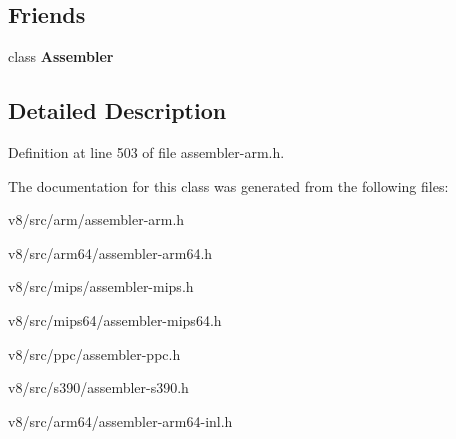 \subsection*{Friends}
\begin{DoxyCompactItemize}
\item 
\mbox{\label{classv8_1_1internal_1_1MemOperand_ab679df99d1569d09fdf3358620a4ad34}} 
class {\bfseries Assembler}
\end{DoxyCompactItemize}


\subsection{Detailed Description}


Definition at line 503 of file assembler-\/arm.\+h.



The documentation for this class was generated from the following files\+:\begin{DoxyCompactItemize}
\item 
v8/src/arm/assembler-\/arm.\+h\item 
v8/src/arm64/assembler-\/arm64.\+h\item 
v8/src/mips/assembler-\/mips.\+h\item 
v8/src/mips64/assembler-\/mips64.\+h\item 
v8/src/ppc/assembler-\/ppc.\+h\item 
v8/src/s390/assembler-\/s390.\+h\item 
v8/src/arm64/assembler-\/arm64-\/inl.\+h\end{DoxyCompactItemize}
